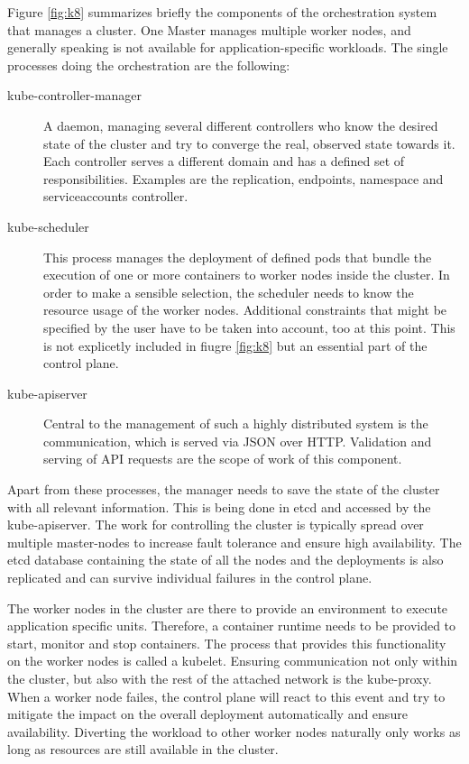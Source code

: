 Figure \ref{fig:k8} summarizes briefly the components of the orchestration system that manages a cluster. One Master manages multiple worker nodes, and generally speaking is not available for application-specific workloads. The single processes doing the orchestration are the following:

\setlength{\leftmargini}{0pt} 
\begin{description}
	\item [kube-controller-manager] A daemon, managing several different controllers who know the desired state of the cluster and try to converge the real, observed state towards it. Each controller serves a different domain and has a defined set of responsibilities. Examples are the replication, endpoints, namespace and serviceaccounts controller.
	
	\item [kube-scheduler] This process manages the deployment of defined pods that bundle the execution of one or more containers to worker nodes inside the cluster. In order to make a sensible selection, the scheduler needs to know the resource usage of the worker nodes. Additional constraints that might be specified by the user have to be taken into account, too at this point. This is not explicetly included in fiugre \ref{fig:k8} but an essential part of the control plane.
	
	\item [kube-apiserver] Central to the management of such a highly distributed system is the communication, which is served via JSON over HTTP. Validation and serving of API requests are the scope of work of this component. 
	
\end{description}

Apart from these processes, the manager needs to save the state of the cluster with all relevant information. This is being done in etcd and accessed by the kube-apiserver. The work for controlling the cluster is typically spread over multiple master-nodes to increase fault tolerance and ensure high availability. The etcd database containing the state of all the nodes and the deployments is also replicated and can survive individual failures in the control plane. 

The worker nodes in the cluster are there to provide an environment to execute application specific units. Therefore, a container runtime needs to be provided to start, monitor and stop containers. The process that provides this functionality on the worker nodes is called a kubelet. Ensuring communication not only within the cluster, but also with the rest of the attached network is the kube-proxy. When a worker node failes, the control plane will react to this event and try to mitigate the impact on the overall deployment automatically and ensure availability. Diverting the workload to other worker nodes naturally only works as long as resources are still available in the cluster. 


